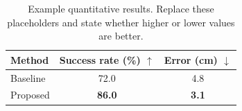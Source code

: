 \begin{table}[htbp]
  \caption{Example quantitative results. Replace these placeholders and state
    whether higher or lower values are better.}
  \label{tab:results}
  \centering
  \begin{tabular}{lcc}
    \toprule
    Method & Success rate (\%) $\uparrow$ & Error (cm) $\downarrow$ \\
    \midrule
    Baseline & 72.0 & 4.8 \\
    Proposed & \textbf{86.0} & \textbf{3.1} \\
    \bottomrule
  \end{tabular}
\end{table}
